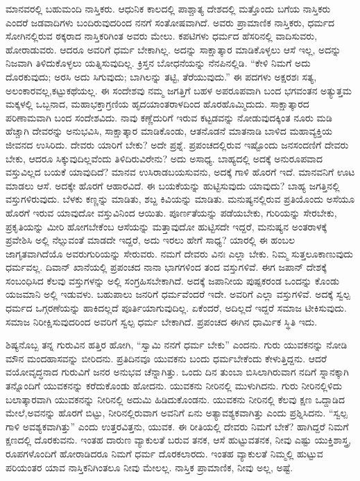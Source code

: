 ಮಾನವರಲ್ಲಿ ಬಹುಮಂದಿ ನಾಸ್ತಿಕರು. ಆಧುನಿಕ ಕಾಲದಲ್ಲಿ ಪಾಶ್ಚಾತ್ಯ ದೇಶದಲ್ಲಿ ಮತ್ತೊಂದು ಬಗೆಯ ನಾಸ್ತಿಕರು ಎಂದರೆ ಜಡವಾದಿಗಳು ಬಂದಿರುವುದರಿಂದ ನನಗೆ ಸಂತೋಷವಾಗಿದೆ. ಅವರು ಪ್ರಾಮಾಣಿಕ ನಾಸ್ತಿಕರು, ಧರ್ಮದ ಸೋಗಿನಲ್ಲಿರುವ ಠಕ್ಕರಾದ ನಾಸ್ತಿಕರಿಗಿಂತ ಅವರು ಮೇಲು. ಕಪಟಿಗಳು ಧರ್ಮದ ಹೆಸರಿನಲ್ಲಿ ವಾದಿಸುವರು, ಹೋರಾಡುವರು. ಆದರೂ ಅವರಿಗೆ ಧರ್ಮ ಬೇಕಾಗಿಲ್ಲ. ಅದನ್ನು ಸಾಕ್ಷಾತ್ಕಾರ ಮಾಡಿಕೊಳ್ಳಲು ಆಸೆ ಇಲ್ಲ, ಅದನ್ನು ನಿಜವಾಗಿ ತಿಳಿದುಕೊಳ್ಳಲು ಯತ್ನಿಸುವುದಿಲ್ಲ. ಕ್ರಿಸ್ತನ ಬೋಧನೆಯನ್ನು ನೆನಪಿನಲ್ಲಿಡಿ. “ಕೇಳಿ ನಿಮಗೆ ಅದು ದೊರಕುವುದು; ಅರಸಿ ಅದು ಸಿಗುವುದು; ಬಾಗಿಲನ್ನು ತಟ್ಟಿ, ತೆರೆಯುವುದು.” ಈ ಪದಗಳು ಅಕ್ಷರಶಃ ಸತ್ಯ, ಅಲಂಕಾರವಲ್ಲ,\break ಕಟ್ಟುಕಥೆಯಲ್ಲ. ಈ ಸಂದೇಶವು ನಮ್ಮ ಜಗತ್ತಿಗೆ ಬಹಳ ಅಪರೂಪವಾಗಿ ಬಂದ ಭಗವಂತನ ಅತ್ಯುತ್ತಮ ಮಕ್ಕಳಲ್ಲಿ ಒಬ್ಬನಾದ, ಮಹಾಭಕ್ತಾಗ್ರಣಿಯ ಹೃದಯಾಂತರಾಳದಿಂದ ಹೊರಹೊಮ್ಮಿದುದು. ಸಾಕ್ಷಾತ್ಕಾರದ ಪರಿಣಾಮವಾಗಿ ಬಂದ ಸಂದೇಶವಿದು. ನಾವು ಕಣ್ಣೆದುರಿಗೆ ಇರುವ ಕಟ್ಟಡವನ್ನು ನೋಡುವುದಕ್ಕಿಂತ ನೂರು ಮಡಿ ಹೆಚ್ಚಾಗಿ ದೇವರನ್ನು ಅನುಭವಿಸಿ, ಸಾಕ್ಷಾತ್ಕಾರ ಮಾಡಿಕೊಂಡು, ಆತನೊಡನೆ ಮಾತನಾಡಿ ಬಾಳಿದ ಮಹಾವ್ಯಕ್ತಿಯ ಜೀವನದ ಉಸಿರಿದು. ದೇವರು ಯಾರಿಗೆ ಬೇಕು? ಅದೇ ಪ್ರಶ್ನೆ. ಪ್ರಪಂಚದಲ್ಲಿರುವ ಇಷ್ಟೊಂದು ಜನಸಂದಣಿಗೆ ದೇವರು ಬೇಕು, ಆದರೂ ಸಿಕ್ಕುವುದಿಲ್ಲವೆಂದು ತಿಳಿದಿರುವಿರೇನು? ಅದು ಅಸಾಧ್ಯ. ಬಾಹ್ಯದಲ್ಲಿ ಅದಕ್ಕೆ ಅನುರೂಪವಾದ ವಸ್ತುವಿಲ್ಲದ ಬಯಕೆ ಯಾವುದಿದೆ? ಮಾನವ ಉಸಿರಾಡಬಯಸುವನು, ಅದಕ್ಕೆ ಗಾಳಿ ಹೊರಗೆ ಇದೆ. ಮಾನವನಿಗೆ ಊಟ ಮಾಡಲು ಆಸೆ. ಅದಕ್ಕೇ ಹೊರಗೆ ಆಹಾರವಿದೆ. ಈ ಬಯಕೆಯನ್ನು ಹುಟ್ಟಿಸುವುದು ಯಾವುದು? ಬಾಹ್ಯ ಜಗತ್ತಿನಲ್ಲಿ ವಸ್ತುಗಳಿರುವುದು. ಬೆಳಕು ಕಣ್ಣನ್ನು ಮಾಡಿತು, ಶಬ್ದ ಕಿವಿಯನ್ನು ಮಾಡಿತು. ಮನುಷ್ಯನಲ್ಲಿರುವ ಪ್ರತಿಯೊಂದು ಅಸೆಯೂ ಹೊರಗೆ ಇರುವ ಯಾವುದೋ ವಸ್ತುವಿನಿಂದ ಆಯಿತು. ಪೂರ್ಣತೆಯನ್ನು ಪಡೆಯಬೇಕು, ಗುರಿಯನ್ನು ಸೇರಬೇಕು, ಪ್ರಕೃತಿಯನ್ನು ಮೀರಿ ಹೋಗಬೇಕೆಂಬ ಆಸೆಯನ್ನು ಮತ್ತಾವುದೋ ಹುಟ್ಟಿಸದೇ ಇದ್ದರೆ, ಮನುಷ್ಯನ ಅಂತರಾಳಕ್ಕೆ ಪ್ರವೇಶಿಸಿ ಅಲ್ಲಿ ನೆಲ್ಸುವಂತೆ ಮಾಡದೇ ಇದ್ದರೆ, ಅದು ಇರಲು ಹೇಗೆ ಸಾಧ್ಯ? ಯಾರಲ್ಲಿ ಈ ಹಂಬಲ ಜಾಗೃತವಾಗಿದೆಯೊ ಅವರು\break ಗುರಿಯನ್ನು ಸೇರುವರು. ನಮಗೆ ದೇವರು ವಿನಃ ಎಲ್ಲಾ ಬೇಕು. ನಿಮ್ಮ ಸುತ್ತಲೂ\break ಕಾಣುವುದು ಧರ್ಮವಲ್ಲ. ದಿವಾನ್​ ಖಾನೆಯಲ್ಲಿ ಪ್ರಪಂಚದ ನಾನಾ ಭಾಗಗಳಿಂದ ತಂದ ವಸ್ತುಗಳಿವೆ. ಈಗ ಜಪಾನ್​ ದೇಶಕ್ಕೆ ಸಂಬಂಧಿಸಿದ ಕೆಲವು ವಸ್ತುಗಳನ್ನು ಅಲ್ಲಿ ಸಂಗ್ರಹಿಸ\-ಬೇಕಾಗಿದೆ. ಅದಕ್ಕೆ ಜಪಾನೀಯ ಪುಷ್ಪಕರಂಡ ಒಂದನ್ನು ಕೊಂಡು ಯಜಮಾನಿ ಅಲ್ಲಿ ಇಡುವಳು. ಬಹುಪಾಲು ಜನರಿಗೆ ಧರ್ಮವೆಂದರೆ ಇದೇ. ಅವರಿಗೆ ಎಲ್ಲಾ ವಸ್ತುಗಳಿವೆ. ಅದಕ್ಕೆ ಸ್ವಲ್ಪ ಧರ್ಮದ ಒಗ್ಗರಣೆಯನ್ನು ಹಾಕಿದಲ್ಲದೆ ಪೂರ್ತಿಯಾಗುವುದಿಲ್ಲ. ಏಕೆಂದರೆ, ಅದಿಲ್ಲದೆ ಇದ್ದರೆ ಸಮಾಜ ಟೀಕಿಸುವುದು. ಸಮಾಜ ನಿರೀಕ್ಷಿಸುವುದರಿಂದ ಅವರಿಗೆ ಸ್ವಲ್ಪ ಧರ್ಮ ಬೇಕಾಗಿದೆ. ಪ್ರಪಂಚದ ಈಗಿನ ಧಾರ್ಮಿಕ ಸ್ಥಿತಿ ಇದು.

ಶಿಷ್ಯನೊಬ್ಬ ತನ್ನ ಗುರುವಿನ ಹತ್ತಿರ ಹೋಗಿ, “ಸ್ವಾಮಿ ನನಗೆ ಧರ್ಮ ಬೇಕು” ಎಂದನು. ಗುರು ಯುವಕನನ್ನು ನೋಡಿ ಮೌನ ಮಂದಹಾಸವನ್ನು ಬೀರಿದನು. ಪ್ರತಿದಿನವೂ ಯುವಕನು ಬಂದು ಧರ್ಮಬೇಕೆಂದು ಕೇಳುತ್ತಿದ್ದನು. ಆದರೆ ವಯೋವೃದ್ಧನಾದ ಗುರುವಿಗೆ ಜನರ ಅನುಭವ ಚೆನ್ನಾಗಿತ್ತು. ಒಂದು ದಿನ ತುಂಬಾ ಬಿಸಿಲಾಗಿರುವಾಗ ನದಿಗೆ ಸ್ನಾನಕ್ಕಾಗಿ ತನ್ನೊಂದಿಗೆ ಯುವಕನನ್ನು ಕರೆದುಕೊಂಡು ಹೋದನು. ಯುವಕನು ನೀರಿನಲ್ಲಿ ಮುಳುಗಿದನು. ಗುರು ನೀರಿನಲ್ಲಿಳಿದು ಬಲಾತ್ಕಾರವಾಗಿ ಯುವಕನನ್ನು ನೀರಿನಲ್ಲಿ ಅದುಮಿ ಹಿಡಿದುಕೊಂಡನು. ಯುವಕನು ನೀರಿನಲ್ಲಿ ಕೆಲವು ಕ್ಷಣ ಒದ್ದಾಡಿದ ಮೇಲೆ,\break ಅವನನ್ನು ಹೊರಗೆ ಬಿಟ್ಟು, ನೀರಿನಲ್ಲಿರುವಾಗ ಅವನಿಗೆ ಏನು ಅತ್ಯಾವಶ್ಯಕವಾಗಿತ್ತು ಎಂದು ಪ್ರಶ್ನಿಸಿದನು. “ಸ್ವಲ್ಪ ಗಾಳಿ ಅವಶ್ಯಕವಾಗಿತ್ತು” ಎಂದು ಉತ್ತರವಿತ್ತನು, ಯುವಕ. ಈ ರೀತಿಯಲ್ಲಿ ದೇವರು ನಿಮಗೆ ಬೇಕೆ? ಹಾಗಿದ್ದರೆ ನಿಮಗೆ ಕ್ಷಣದಲ್ಲಿ ದೊರಕುವನು. ಇಂತಹ ದಾರುಣ ವ್ಯಾಕುಲತೆ ಬರುವ ತನಕ, ಆಸೆ ಹುಟ್ಟುವತನಕ, ನೀವು ಎಷ್ಟು ಯುಕ್ತಿಶಾಸ್ತ್ರ, ರೂಪಗಳೊಂದಿಗೆ ಹೋರಾಡಿದರೂ ನಿಮಗೆ ಧರ್ಮ ದೊರಕಲಾರದು. ಇಂತಹ ವ್ಯಾಕುಲತೆ ನಿಮ್ಮಲ್ಲಿ ಹುಟ್ಟುವ ಪರಿಯಂತರ ಯಾವ ನಾಸ್ತಿಕನಿಗಿಂತಲೂ ನೀವು ಮೇಲಲ್ಲ. ನಾಸ್ತಿಕ ಪ್ರಾಮಾಣಿಕ, ನೀವು ಅಲ್ಲ, ಅಷ್ಟೆ.

